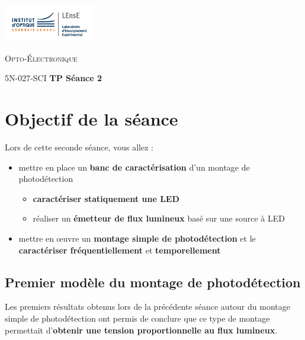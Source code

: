 \newpage

\begin{minipage}[c]{.25\linewidth}
	\includegraphics[width=4cm]{images/LEnsE_IOGS.jpg}
\end{minipage} \hfill
\begin{minipage}[c]{.4\linewidth}

\begin{center}
\vspace{0.3cm}
{\Large \textsc{Opto-Électronique}}

\medskip

5N-027-SCI \qquad \textbf{\Large TP Séance 2}

\end{center}
\end{minipage}\hfill

\section{Objectif de la séance}

Lors de cette seconde séance, vous allez :

\begin{itemize}
	\item mettre en place un \textbf{banc de caractérisation} d'un montage de photodétection
	\begin{itemize}
		\item \textbf{caractériser statiquement une LED}	
		\item réaliser un \textbf{émetteur de flux lumineux} basé sur une source à LED
	\end{itemize} 
	
	\item mettre en \oe{}uvre un \textbf{montage simple de photodétection} et le \textbf{caractériser fréquentiellement} et \textbf{temporellement}
\end{itemize} 


\subsection{Premier modèle du montage de photodétection}

Les premiers résultats obtenus lors de la précédente séance autour du montage simple de photodétection ont permis de conclure que ce type de montage permettait d'\textbf{obtenir une tension proportionnelle au flux lumineux}.

